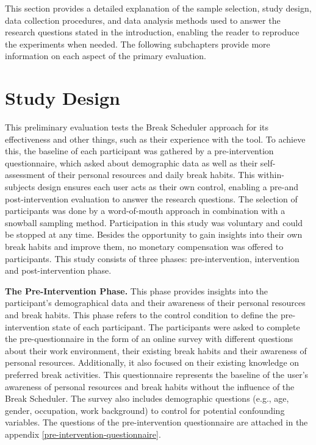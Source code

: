\documentclass{hasel_thesis}
\begin{document}
This section provides a detailed explanation of the sample selection, study design, data collection procedures, and data analysis methods used to answer the research questions stated in the introduction, enabling the reader to reproduce the experiments when needed. The following subchapters provide more information on each aspect of the primary evaluation.

\section{Study Design}

This preliminary evaluation tests the Break Scheduler approach for its effectiveness and other things, such as their experience with the tool. To achieve this, the baseline of each participant was gathered by a pre-intervention questionnaire, which asked about demographic data as well as their self-assessment of their personal resources and daily break habits. This within-subjects design ensures each user acts as their own control, enabling a pre-and post-intervention evaluation to answer the research questions. The selection of participants was done by a word-of-mouth approach in combination with a snowball sampling method. Participation in this study was voluntary and could be stopped at any time. Besides the opportunity to gain insights into their own break habits and improve them, no monetary compensation was offered to participants. This study consists of three phases: pre-intervention, intervention and post-intervention phase. 

\textbf{The Pre-Intervention Phase.} This phase provides insights into the participant's demographical data and their awareness of their personal resources and break habits. This phase refers to the control condition to define the pre-intervention state of each participant. The participants were asked to complete the pre-questionnaire in the form of an online survey with different questions about their work environment, their existing break habits and their awareness of personal resources. Additionally, it also focused on their existing knowledge on preferred break activities. This questionnaire represents the baseline of the user's awareness of personal resources and break habits without the influence of the Break Scheduler. The survey also includes demographic questions (e.g., age, gender, occupation, work background) to control for potential confounding variables. The questions of the pre-intervention questionnaire are attached in the appendix \ref{pre-intervention-questionnaire}.
\end{document}
